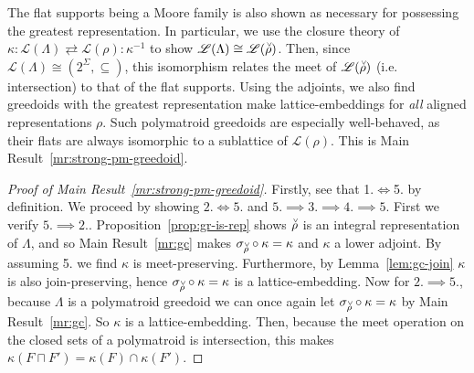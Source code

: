 \documentclass[11pt]{article}
\newcommand{\univ}{\Sigma}
\newcommand{\glang}{\Lambda}
\providecommand{\L}{}
\renewcommand{\L}{\mathscr{L}}
\begin{document}
The flat supports being a Moore family is also shown as necessary for possessing the greatest representation.
In particular, we use the closure theory of $\kappa:\L(\glang)\rightleftarrows\L(\rho):\kappa^{-1}$ to show $\L(\glang)\cong\L(\accentset{\vee}{\rho})$.
Then, since $\L(\glang)\cong(2^\univ,\subseteq)$, this isomorphism relates the meet of $\L(\accentset{\vee}{\rho})$ (i.e. intersection) to that of the flat supports.
Using the adjoints, we also find greedoids with the greatest representation make lattice-embeddings for \emph{all} aligned representations $\rho$.
Such polymatroid greedoids are especially well-behaved, as their flats are always isomorphic to a sublattice of $\L(\rho)$.
This is Main Result~\ref{mr:strong-pm-greedoid}.
\begin{proof}[Proof of Main Result~\ref{mr:strong-pm-greedoid}]
    Firstly, see that 1.$\iff$5. by definition.
    We proceed by showing $2.\iff 5.$ and $5. \implies 3.\implies 4. \implies 5.$
    First we verify $5.\implies 2.$.
    Proposition~\ref{prop:gr-is-rep} shows $\accentset{\vee}{\rho}$ is an integral representation of $\glang$, and so Main Result~\ref{mr:gc} makes $\sigma_{\accentset{\vee}{\rho}}\circ\kappa = \kappa$ and $\kappa$ a lower adjoint.
    By assuming 5. we find $\kappa$ is meet-preserving.
    Furthermore, by Lemma~\ref{lem:gc-join} $\kappa$ is also join-preserving, hence $\sigma_{\accentset{\vee}{\rho}}\circ\kappa = \kappa$ is a lattice-embedding.
    Now for $2. \implies 5.$, because $\glang$ is a polymatroid greedoid we can once again let $\sigma_{\accentset{\vee}{\rho}}\circ\kappa = \kappa$ by Main Result~\ref{mr:gc}.
    So $\kappa$ is a lattice-embedding.
    Then, because the meet operation on the closed sets of a polymatroid is intersection, this makes $\kappa(F\sqcap F') = \kappa(F)\cap\kappa(F')$.


\end{proof}
\end{document}
